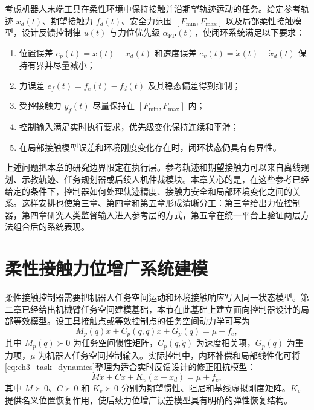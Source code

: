 \begin{problem}[柔性接触力位协同控制问题]
\label{prob:ch3_force_position_control}
考虑机器人末端工具在柔性环境中保持接触并沿期望轨迹运动的任务。给定参考轨迹 $x_d(t)$、期望接触力 $f_d(t)$、安全力范围 $[F_{\min},F_{\max}]$ 以及局部柔性接触模型，设计反馈控制律 $u(t)$ 与力位优先级 $\alpha_{\mathrm{FP}}(t)$，使闭环系统满足以下要求：
\begin{enumerate}[label=(\arabic*)]
  \item 位置误差 $e_p(t)=x(t)-x_d(t)$ 和速度误差 $e_v(t)=\dot x(t)-\dot x_d(t)$ 保持有界并尽量减小；
  \item 力误差 $e_f(t)=f_e(t)-f_d(t)$ 及其稳态偏差得到抑制；
  \item 受控接触力 $y_f(t)$ 尽量保持在 $[F_{\min},F_{\max}]$ 内；
  \item 控制输入满足实时执行要求，优先级变化保持连续和平滑；
  \item 在局部接触模型误差和环境刚度变化存在时，闭环状态仍具有有界性。
\end{enumerate}
\end{problem}

上述问题把本章的研究边界限定在执行层。参考轨迹和期望接触力可以来自离线规划、示教轨迹、任务规划器或后续人机仲裁模块。本章关心的是，在这些参考已经给定的条件下，控制器如何处理轨迹精度、接触力安全和局部环境变化之间的关系。这样安排也使第三章、第四章和第五章形成清晰分工：第三章给出力位控制器，第四章研究人类监督输入进入参考层的方式，第五章在统一平台上验证两层方法组合后的系统表现。

\section{柔性接触力位增广系统建模}
\label{sec:ch3_augmented_model}

柔性接触控制器需要把机器人任务空间运动和环境接触响应写入同一状态模型。第二章已经给出机械臂任务空间建模基础，本节在此基础上建立面向控制器设计的局部等效模型。设工具接触点或等效控制点的任务空间动力学可写为
\begin{equation}
  M_p(q)\ddot x+C_p(q,\dot q)\dot x+G_p(q)=\mu+f_e,
  \label{eq:ch3_task_dynamics}
\end{equation}
其中 $M_p(q)\succ0$ 为任务空间惯性矩阵，$C_p(q,\dot q)$ 为速度相关项，$G_p(q)$ 为重力项，$\mu$ 为机器人任务空间控制输入。实际控制中，内环补偿和局部线性化可将\eqref{eq:ch3_task_dynamics}整理为适合实时反馈设计的修正阻抗模型\cite{hogan1985impedance}：
\begin{equation}
  M\ddot x+C\dot x+K_v(x-x_d)=\mu+f_e,
  \label{eq:ch3_impedance}
\end{equation}
其中 $M\succ0$、$C\succ0$ 和 $K_v\succ0$ 分别为期望惯性、阻尼和基线虚拟刚度矩阵。$K_v$ 提供名义位置恢复作用，使后续力位增广误差模型具有明确的弹性恢复结构。

